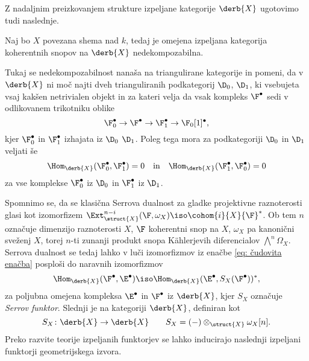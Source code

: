 Z nadaljnim preizkovanjem strukture izpeljane kategorije $\derb{X}$ ugotovimo tudi naslednje.

\begin{izrek}
    Naj bo $X$ povezana shema nad $k$, tedaj je omejena izpeljana kategorija koherentnih snopov na $\derb{X}$ nedekompozabilna. 
\end{izrek}

Tukaj se nedekompozabilnost nanaša na triangulirane kategorije in pomeni, da v $\derb{X}$ ni moč najti dveh trianguliranih podkategorij $\D_0$, $\D_1$, ki vsebujeta vsaj kakšen netrivialen objekt in za kateri velja da vsak kompleks $\F^\bullet$ sedi v odlikovanem trikotniku oblike 
\[
    \F_0^\bullet \to \F^\bullet \to \F_1^\bullet \to \F_0[1]^\bullet,
\]
kjer $\F_0^\bullet$ in $\F_1^\bullet$ izhajata iz $\D_0$ \oz $\D_1$. Poleg tega mora za podkategoriji $\D_0$ in $\D_1$ veljati še 
\begin{equation*}
    \Hom_{\derb{X}}(\F_0^\bullet, \F_1^\bullet) = 0 \quad \text{in} \quad 
    \Hom_{\derb{X}}(\F_1^\bullet, \F_0^\bullet) = 0
\end{equation*}  
za vse komplekse $\F_0^\bullet$ iz $\D_0$ in $\F_1^\bullet$ iz $\D_1$.

Spomnimo se, da se klasična Serrova dualnost za gladke projektivne raznoterosti glasi kot izomorfizem $\Ext_{\struct{X}}^{n-i}(\F, \omega_X) \iso \cohom{i}{X}{\F}^*$. Ob tem $n$ označuje dimenzijo raznoterosti $X$, $\F$ koherentni snop na $X$, $\omega_X$ pa kanonični sveženj $X$, torej $n$-ti zunanji produkt snopa Kählerjevih diferencialov $\bigwedge^n \Omega_X$. Serrova dualnost se tedaj lahko v luči izomorfizmov iz enačbe \eqref{eq: čudovita enačba} posploši do naravnih izomorfizmov 
\[
    \Hom_{\derb{X}}(\F^\bullet, \E^\bullet) \iso \Hom_{\derb{X}}(\E^\bullet, S_X(\F^\bullet))^*,  
\]
za poljubna omejena kompleksa $\E^\bullet$ in $\F^\bullet$ iz $\derb{X}$, kjer $S_X$ označuje \ti \emph{Serrov funktor}. Slednji je na kategoriji $\derb{X}$, definiran kot 
\[
    S_X \colon \derb{X} \to \derb{X} \qquad S_X = (-) \otimes_{\struct{X}} \omega_X[n].
\]
Preko razvite teorije izpeljanih funktorjev se lahko inducirajo naslednji izpeljani funktorji geometrijskega izvora. 

